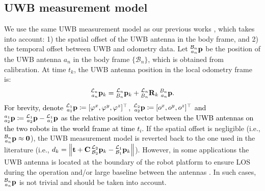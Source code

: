 \documentclass[journal]{IEEEtran}
\newcommand{\norm}[1]{\left\lVert#1\right\rVert}
\def\LocPosHost{\prescript{\mathcal{L}_1}{a_1}{\mathbf{p}}} %
\def\LocPosTarg{\prescript{\mathcal{L}_2}{a_2}{\mathbf{p}}} %
\def\RelPosUWBAnts{\prescript{a_1}{a_2}{\mathbf{p}}}
\begin{document}
\subsection{UWB measurement model}


We use the same UWB measurement model as our previous works \cite{nguyen2022viralfusion,Thien2021RAL}, which takes into account: 1) the spatial offset of the UWB antenna in the body frame, and 2) the temporal offset between UWB and odometry data.
Let $\prescript{\mathcal{B}_n}{a_n}{\mathbf{p}}$ be the position of the UWB antenna $a_n$ in the body frame $\{\mathcal{B}_n\}$, which is obtained from calibration. At time $t_k$, the UWB antenna position in the local odometry frame is:
\begin{equation}
    \prescript{\mathcal{L}_n}{a_n}{\mathbf{p}}_k =
    \prescript{\mathcal{L}_n}{B_n}{\mathbf{p}}_k + \prescript{\mathcal{L}_n}{B_n}{\mathbf{R}}_k \prescript{B_n}{a_n}{\mathbf{p}}.
\end{equation}
\textcolor{black}{
For brevity, denote ${\LocPosHost \coloneqq [\varphi^x, \varphi^y, \varphi^z]^\top}$, ${\LocPosTarg \coloneqq [o^x, o^y, o^z]^\top}$ and ${\RelPosUWBAnts \coloneqq \prescript{\mathcal{L}_1}{a_2}{\mathbf{p}} - \LocPosHost}$ as the relative position vector between the UWB antennas on the two robots in the world frame at time $t_i$.
}
If the spatial offset is negligible (i.e., $\prescript{\mathcal{B}_n}{a_n}{\mathbf{p}} \approx \mathbf{0}$), the UWB measurement model is reverted back to the one used in the literature (i.e., $d_k = \norm{\mathbf{t} + \mathbf{C} \prescript{\mathcal{L}_2}{\mathcal{B}_2}{\mathbf{p}}_k - \prescript{\mathcal{L}_1}{\mathcal{B}_1}{\mathbf{p}}_k}$). However, in some applications the UWB antenna is located at the boundary of the robot platform to ensure LOS during the operation and/or large baseline between the antennas \cite{nguyen2022viralfusion,xianjia2021cooperative}. 
In such cases, $\prescript{\mathcal{B}_n}{a_n}{\mathbf{p}}$ is not trivial and should be taken into account.
\end{document}
